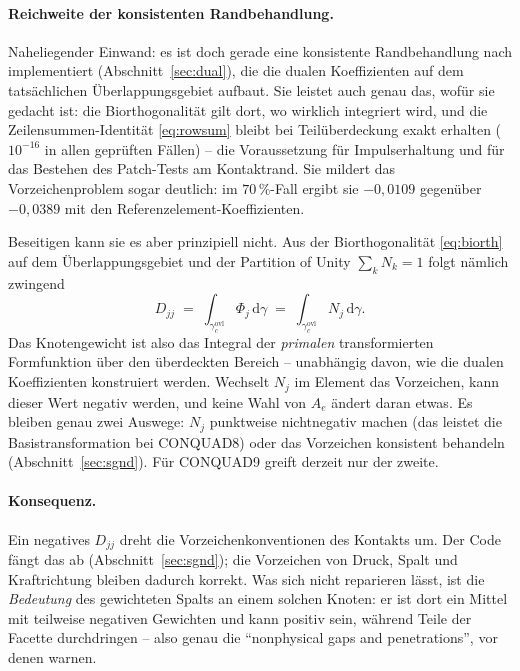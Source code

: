\documentclass[a4paper,11pt]{article}
\def\bm#1{#1}%
\def\tilde#1{#1}%
\begin{document}
\paragraph{Reichweite der konsistenten Randbehandlung.} Naheliegender Einwand: es ist doch
gerade eine konsistente Randbehandlung nach \citet{cichosz} implementiert
(Abschnitt~\ref{sec:dual}), die die dualen Koeffizienten auf dem tatsächlichen Überlappungsgebiet
aufbaut. Sie leistet auch genau das, wofür sie gedacht ist: die Biorthogonalität gilt dort, wo
wirklich integriert wird, und die Zeilensummen-Identität \eqref{eq:rowsum} bleibt bei
Teilüberdeckung exakt erhalten ($10^{-16}$ in allen geprüften Fällen) -- die Voraussetzung für
Impulserhaltung und für das Bestehen des Patch-Tests am Kontaktrand. Sie mildert das
Vorzeichenproblem sogar deutlich: im $70\,\%$-Fall ergibt sie $-0{,}0109$ gegenüber $-0{,}0389$ mit
den Referenzelement-Koeffizienten.

Beseitigen kann sie es aber prinzipiell nicht. Aus der Biorthogonalität \eqref{eq:biorth} auf dem
Überlappungsgebiet und der Partition of Unity $\sum_k\tilde N_k=1$ folgt nämlich zwingend
\begin{equation}
\tilde D_{jj} \;=\; \int_{\gamma_c^{\text{ovl}}}\Phi_j\,\mathrm d\gamma
\;=\; \int_{\gamma_c^{\text{ovl}}}\tilde N_j\,\mathrm d\gamma .
\label{eq:weightisprimal}
\end{equation}
Das Knotengewicht ist also das Integral der \emph{primalen} transformierten Formfunktion über den
überdeckten Bereich -- unabhängig davon, wie die dualen Koeffizienten konstruiert werden. Wechselt
$\tilde N_j$ im Element das Vorzeichen, kann dieser Wert negativ werden, und keine Wahl von
$\bm A_e$ ändert daran etwas. Es bleiben genau zwei Auswege: $\tilde N_j$ punktweise nichtnegativ
machen (das leistet die Basistransformation bei CONQUAD8) oder das Vorzeichen konsistent behandeln
(Abschnitt~\ref{sec:sgnd}). Für CONQUAD9 greift derzeit nur der zweite.

\paragraph{Konsequenz.} Ein negatives $\tilde D_{jj}$ dreht die Vorzeichenkonventionen des
Kontakts um. Der Code fängt das ab (Abschnitt~\ref{sec:sgnd}); die Vorzeichen von Druck, Spalt und
Kraftrichtung bleiben dadurch korrekt. Was sich nicht reparieren lässt, ist die \emph{Bedeutung}
des gewichteten Spalts an einem solchen Knoten: er ist dort ein Mittel mit teilweise negativen
Gewichten und kann positiv sein, während Teile der Facette durchdringen -- also genau die
``nonphysical gaps and penetrations'', vor denen \citet[Abschn.~4.3]{popp2012} warnen.
\end{document}
